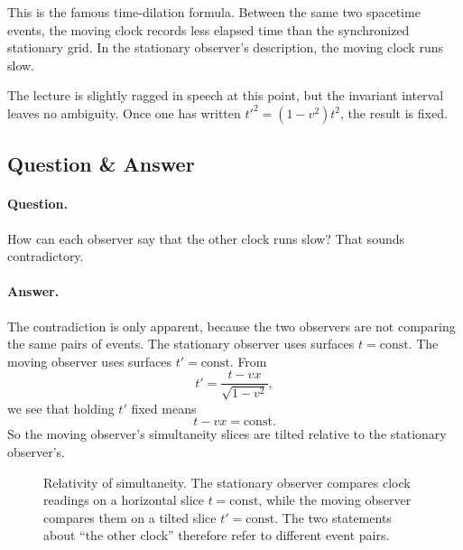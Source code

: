 This is the famous time-dilation formula. Between the same two spacetime events, the moving clock records less elapsed time than the synchronized stationary grid. In the stationary observer's description, the moving clock runs slow.

The lecture is slightly ragged in speech at this point, but the invariant interval leaves no ambiguity. Once one has written \(t'^2=(1-v^2)t^2\), the result is fixed.

\subsection{Question \& Answer}

\paragraph{Question.} How can each observer say that the other clock runs slow? That sounds contradictory.

\paragraph{Answer.} The contradiction is only apparent, because the two observers are not comparing the same pairs of events. The stationary observer uses surfaces \(t=\mathrm{const}\). The moving observer uses surfaces \(t'=\mathrm{const}\). From
\begin{equation}
t'=\frac{t-vx}{\sqrt{1-v^2}},
\end{equation}
we see that holding \(t'\) fixed means
\begin{equation}
t-vx=\mathrm{const}.
\end{equation}
So the moving observer's simultaneity slices are tilted relative to the stationary observer's.

\begin{figure}[h]
\centering
{}
\caption{Relativity of simultaneity. The stationary observer compares clock readings on a horizontal slice \(t=\mathrm{const}\), while the moving observer compares them on a tilted slice \(t'=\mathrm{const}\). The two statements about ``the other clock'' therefore refer to different event pairs.}
\end{figure}

